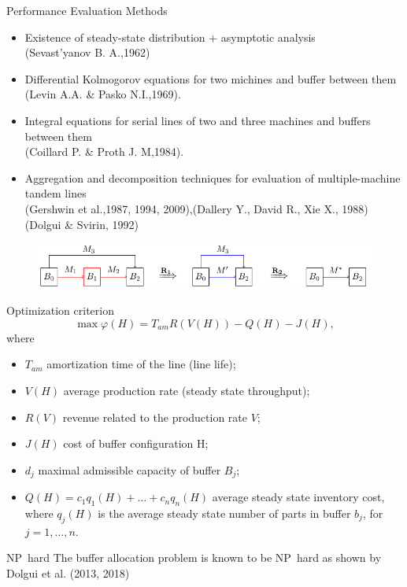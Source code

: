 \documentclass[aspectratio=169,xcolor=dvipsnames]{beamer}
\begin{document}

\begin{frame}{Performance Evaluation Methods}
    \begin{itemize}
	\item Existence of steady-state distribution + asymptotic analysis\\
	(Sevast'yanov B. A.,1962)
	\item Differential Kolmogorov equations for two michines and buffer between them \\
	(Levin A.A. \& Pasko N.I.,1969).
	\item Integral equations for serial lines of two and three machines and buffers between them\\
	(Coillard P. \& Proth J. M,1984).
	\item Aggregation and decomposition techniques for evaluation of multiple-machine tandem lines\\
	(Gershwin et al.,1987, 1994, 2009),(Dallery Y., David R., Xie X., 1988)\\
	(Dolgui \& Svirin, 1992)\\
    \end{itemize}
    \begin{figure}
    \includegraphics[scale=0.8]{alg_line}
    \end{figure}
\end{frame}


\begin{frame}{Optimization criterion}
\begin{equation}
\max \varphi(H)=T_{am} R(V(H)) - Q(H) - J(H),
\end{equation}
where 
\begin{itemize}
\item $T_{am}$  amortization time of the line (line life); 
\item $V(H)$  average production rate (steady state throughput); 
\item $R(V)$  revenue related to the production rate $V$; 
\item $J(H)$ cost of buffer configuration H; 
\item $d_j$ maximal admissible capacity of buffer $B_j$;
\item $Q(H)= c_1q_1(H)+ …+c_n q_n(H)$ average steady state inventory cost, where $q_j(H)$ is the average steady state number of parts in buffer $b_j$, for $j=1,…,n$.
\end{itemize}
    \begin{block}{NP~hard}
       The buffer allocation problem is known to be NP~hard as shown by Dolgui et al. (2013, 2018)
    \end{block}
\end{frame}
\end{document}
